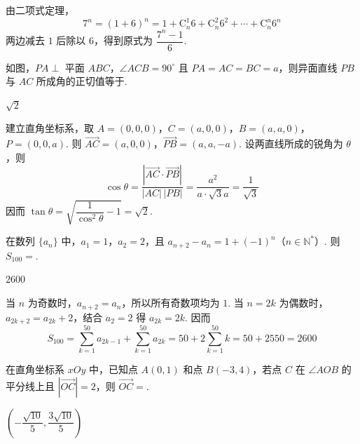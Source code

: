 \begin{solution}
由二项式定理，
\[
7^n=(1+6)^n=1+\mathrm C_n^1 6+\mathrm C_n^2 6^2+\cdots+\mathrm C_n^n6^n
\]
两边减去 \(1\) 后除以 \(6\)，得到原式为 \(\dfrac{7^n-1}{6}\).
\end{solution}

\begin{problem}
如图，\(PA\perp\) 平面 \(ABC\)，\(\angle ACB=90^\circ\) 且
\(PA=AC=BC=a\)，则异面直线 \(PB\) 与 \(AC\) 所成角的正切值等于\fillinblank{}.

\end{problem}

\begin{answer}
\(\sqrt2\)
\end{answer}

\begin{solution}
建立直角坐标系，取 \(A=(0,0,0)\)，\(C=(a,0,0)\)，\(B=(a,a,0)\)，\(P=(0,0,a)\).
则 \(\overrightarrow{AC}=(a,0,0)\)，\(\overrightarrow{PB}=(a,a,-a)\). 设两直线所成的锐角为
\(\theta\)，则
\[
\cos\theta
=\frac{|\overrightarrow{AC}\cdot\overrightarrow{PB}|}{|AC|\,|PB|}
=\frac{a^2}{a\cdot\sqrt3a}
=\frac1{\sqrt3}
\]
因而 \(\tan\theta=\sqrt{\dfrac1{\cos^2\theta}-1}=\sqrt2\).
\end{solution}

\begin{problem}
在数列 \(\{a_n\}\) 中，\(a_1=1\)，\(a_2=2\)，且
\(a_{n+2}-a_n=1+(-1)^n\)（\(n\in\mathbb N^*\)）. 则
\(S_{100}=\)\fillinblank{}.
\end{problem}

\begin{answer}
\(2600\)
\end{answer}

\begin{solution}
当 \(n\) 为奇数时，\(a_{n+2}=a_n\)，所以所有奇数项均为 \(1\). 当 \(n=2k\) 为偶数时，
\(a_{2k+2}=a_{2k}+2\)，结合 \(a_2=2\) 得 \(a_{2k}=2k\). 因而
\[
S_{100}
=\sum_{k=1}^{50}a_{2k-1}+\sum_{k=1}^{50}a_{2k}
=50+2\sum_{k=1}^{50}k
=50+2550
=2600
\]
\end{solution}

\begin{problem}
在直角坐标系 \(xOy\) 中，已知点 \(A(0,1)\) 和点 \(B(-3,4)\)，若点 \(C\) 在
\(\angle AOB\) 的平分线上且 \(\left|\overrightarrow{OC}\right|=2\)，则
\(\overrightarrow{OC}=\)\fillinblank{}.
\end{problem}

\begin{answer}
\(\left(-\dfrac{\sqrt{10}}5,\dfrac{3\sqrt{10}}5\right)\)
\end{answer}

